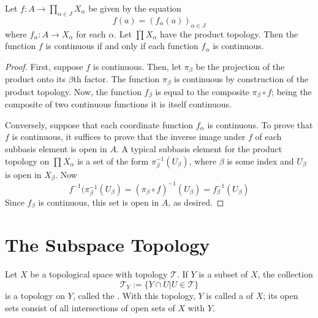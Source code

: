 \documentclass[12pt, a4paper, oneside, openright, titlepage]{book}
\begin{document}
\begin{thm}
    Let $f:A\rightarrow \prod_{\alpha \in J}X_{\alpha}$ be given by the equation \begin{equation*}
        f(a) = (f_{\alpha}(a))_{\alpha \in J}
    \end{equation*}
    where $f_{\alpha}:A\rightarrow X_{\alpha}$ for each $\alpha$. Let $\prod X_{\alpha}$ have the product topology. Then the function $f$ is continuous if and only if each function $f_{\alpha}$ is continuous.
\end{thm}
\begin{proof}
    First, suppose $f$ is continuous. Then, let $\pi_{\beta}$ be the projection of the product onto its $\beta$th factor. The function $\pi_{\beta}$ is continuous by construction of the product topology. Now, the function $f_{\beta}$ is equal to the composite $\pi_{\beta} \circ f$; being the composite of two continuous functions it is itself continuous.

    Conversely, suppose that each coordinate function $f_{\alpha}$ is continuous. To prove that $f$ is continuous, it suffices to prove that the inverse image under $f$ of each subbasis element is open in $A$. A typical subbasis element for the product topology on $\prod X_{\alpha}$ is a set of the form $\pi^{-1}_{\beta}(U_{\beta})$, where $\beta$ is some index and $U_{\beta}$ is open in $X_{\beta}$. Now \begin{equation*}
        f^{-1}(\pi_{\beta}^{-1}(U_{\beta}) = (\pi_{\beta}\circ f)^{-1}(U_{\beta}) = f_{\beta}^{-1}(U_{\beta})
    \end{equation*}
    Since $f_{\beta}$ is continuous, this set is open in $A$, as desired.
\end{proof}




\section{The Subspace Topology}

\begin{defn}
    Let $X$ be a topological space with topology $\mathcal{T}$. If $Y$ is a subset of $X$, the collection \begin{equation*}
        \mathcal{T}_Y :=\{Y\cap U\vert U \in \mathcal{T}\}
    \end{equation*}
    is a topology on $Y$, called the . With this topology, $Y$ is called a  of $X$; its open sets consist of all intersections of open sets of $X$ with $Y$.
\end{defn}
\end{document}
